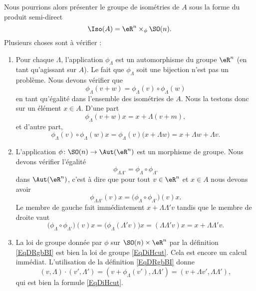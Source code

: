 Nous pourrions alors présenter le groupe de isométries de \( A\) sous la forme du produit semi-direct
\begin{equation}
    \Iso(A)=\eR^n\times_{\phi}\SO(n).
\end{equation}
Plusieurs choses sont à vérifier :
\begin{enumerate}
    \item
        Pour chaque \( \Lambda\), l'application \( \phi_{\Lambda}\) est un automorphisme du groupe \( \eR^n\) (en tant qu'agissant sur \( A\)). Le fait que \( \phi_{\Lambda}\) soit une bijection n'est pas un problème. Nous devons vérifier que
        \begin{equation}
            \phi_{\Lambda}(v+w)=\phi_{\Lambda}(v)\circ\phi_{\Lambda}(w)
        \end{equation}
        en tant qu'égalité dans l'ensemble des isométries de \( A\). Nous la testons donc sur un élément \( x\in A\). D'une part
        \begin{equation}
            \phi_{\Lambda}(v+w)x=x+\Lambda(v+m),
        \end{equation}
        et d'autre part,
        \begin{equation}
            \phi_{\Lambda}(v)\circ\phi_{\Lambda}(w)x=\phi_{\Lambda}(v)\big( x+\Lambda w \big)=x+\Lambda w+\Lambda v.
        \end{equation}
    \item
        L'application \( \phi\colon \SO(n)\to \Aut(\eR^n)\) est un morphisme de groupe. Nous devons vérifier l'égalité
        \begin{equation}
            \phi_{\Lambda\Lambda'}=\phi_{\Lambda}\circ\phi_{\Lambda'}
        \end{equation}
        dans \( \Aut(\eR^n)\), c'est à dire que pour tout \( v\in \eR^n\) et \( x\in A\) nous devons avoir
        \begin{equation}
            \phi_{\Lambda\Lambda'}(v)x=\big( \phi_{\Lambda}\circ\phi_{\Lambda'}\big)(v)x.
        \end{equation}
        Le membre de gauche fait immédiatement \( x+\Lambda\Lambda'v\) tandis que le membre de droite vaut
        \begin{equation}
            \big( \phi_{\Lambda}\circ\phi_{\Lambda'}\big)(v)x=\big( \phi_{\Lambda}(\Lambda'v) \big)x=(\Lambda\Lambda'v)x=x+\Lambda\Lambda'v.
        \end{equation}
    \item
        La loi de groupe donnée par \( \phi\) sur \( \SO(n)\times \eR^n\) par la définition \eqref{EqDRgbBI} est bien la loi de groupe \eqref{EqDiHcut}. Cela est encore un calcul immédiat. L'utilisation de la définition \eqref{EqDRgbBI} donne
        \begin{equation}
            (v,\Lambda)\cdot(v',\Lambda')=(v+\phi_{\Lambda}(v'),\Lambda\Lambda')=(v+\Lambda v',\Lambda\Lambda'),
        \end{equation}
        qui est bien la formule \eqref{EqDiHcut}.
\end{enumerate}

